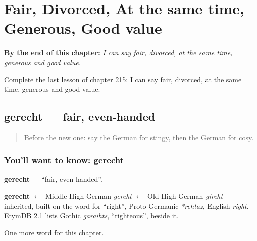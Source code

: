 
\chapter{Fair, Divorced, At the same time, Generous, Good value}
\label{ch:ge-fair-divorced-at-the-same-time-generous-good-value}

\begin{chapteropening}
\textbf{By the end of this chapter:} \emph{I can say fair, divorced, at the same time, generous and good value.}

Complete the last lesson of chapter 215: I can say fair, divorced, at the same time, generous and good value.
\end{chapteropening}

\section[gerecht]{gerecht — fair, even-handed}

\label{lesson:GE-C215-gerecht}



\begin{quote}
Before the new one: say the German for stingy, then the German for cosy.
\end{quote}

\subsection*{You'll want to know: gerecht}
\textbf{gerecht} — \textquotedblleft{}fair, even-handed\textquotedblright{}.

\begin{cousinweb}
\textbf{gerecht} $\leftarrow$ Middle High German \emph{gereht} $\leftarrow$ Old High German \emph{gireht} — inherited, built on the word for \textquotedblleft{}right\textquotedblright{}, Proto-Germanic \emph{*rehtaz}, English \emph{right}. EtymDB 2.1 lists Gothic \emph{garaihts}, \textquotedblleft{}righteous\textquotedblright{}, beside it.
\end{cousinweb}

\begin{grammarlens}[title={What you've built}]
One more word for this chapter.
\end{grammarlens}

